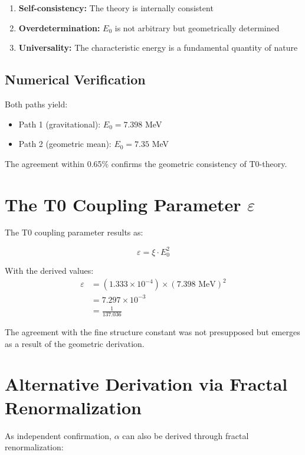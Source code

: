 \documentclass[12pt,a4paper]{article}
\begin{document}
	\begin{enumerate}
		\item \textbf{Self-consistency:} The theory is internally consistent
		\item \textbf{Overdetermination:} $E_0$ is not arbitrary but geometrically determined
		\item \textbf{Universality:} The characteristic energy is a fundamental quantity of nature
	\end{enumerate}
	
	\subsection{Numerical Verification}
	
	Both paths yield:
	\begin{itemize}
		\item Path 1 (gravitational): $E_0 = 7.398$ MeV
		\item Path 2 (geometric mean): $E_0 = 7.35$ MeV
	\end{itemize}
	
	The agreement within 0.65\% confirms the geometric consistency of T0-theory.
	
	\section{The T0 Coupling Parameter $\varepsilon$}
	
	The T0 coupling parameter results as:
	
	\begin{equation}
		\varepsilon = \xi \cdot E_0^2
	\end{equation}
	
	With the derived values:
	\begin{align}
		\varepsilon &= (1.333 \times 10^{-4}) \times (7.398 \text{ MeV})^2\\
		&= 7.297 \times 10^{-3}\\
		&= \frac{1}{137.036}
	\end{align}
	
	The agreement with the fine structure constant was not presupposed but emerges as a result of the geometric derivation.
	
	\section{Alternative Derivation via Fractal Renormalization}
	
	As independent confirmation, $\alpha$ can also be derived through fractal renormalization:
	
\end{document}
